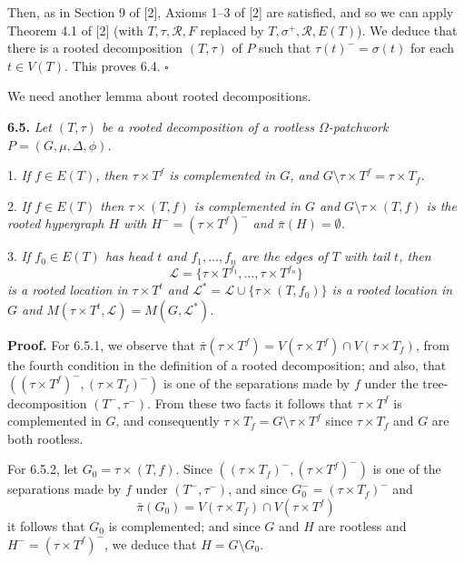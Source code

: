 Then, as in Section 9 of [2], Axioms 1--3 of [2] are satisfied, and so we can apply Theorem 4.1 of [2] (with $T, \tau, \mathscr{R}, F$ replaced by $T, \sigma^+, \mathscr{R}, E(T)$). We deduce that there is a rooted decomposition $(T, \tau)$ of $P$ such that $\tau(t)^- = \sigma(t)$ for each $t \in V(T)$. This proves 6.4. $\square$

We need another lemma about rooted decompositions.

\textbf{6.5.} \textit{Let $(T, \tau)$ be a rooted decomposition of a rootless $\Omega$-patchwork $P = (G, \mu, \Delta, \phi)$.}

\hspace*{12pt}1. \textit{If $f \in E(T)$, then $\tau \times T^f$ is complemented in $G$, and $G \setminus \tau \times T^f = \tau \times T_f$.}

\hspace*{12pt}2. \textit{If $f \in E(T)$ then $\tau \times (T, f)$ is complemented in $G$ and $G \setminus \tau \times (T, f)$ is the rooted hypergraph $H$ with $H^- = (\tau \times T^f)^-$ and $\bar{\pi}(H) = \emptyset$.}

\hspace*{12pt}3. \textit{If $f_0 \in E(T)$ has head $t$ and $f_1, \dots, f_n$ are the edges of $T$ with tail $t$, then}
\begin{equation*}
\mathscr{L} = \{\tau \times T^{f_1}, \dots, \tau \times T^{f_n}\}
\end{equation*}
\textit{is a rooted location in $\tau \times T^t$ and $\mathscr{L}^* = \mathscr{L} \cup \{\tau \times (T, f_0)\}$ is a rooted location in $G$ and $M(\tau \times T^t, \mathscr{L}) = M(G, \mathscr{L}^*)$.}

\textbf{Proof.} For 6.5.1, we observe that $\bar{\pi}(\tau \times T^f) = V(\tau \times T^f) \cap V(\tau \times T_f)$, from the fourth condition in the definition of a rooted decomposition; and also, that $((\tau \times T^f)^-, (\tau \times T_f)^-)$ is one of the separations made by $f$ under the tree-decomposition $(T^-, \tau^-)$. From these two facts it follows that $\tau \times T^f$ is complemented in $G$, and consequently $\tau \times T_f = G \setminus \tau \times T^f$ since $\tau \times T_f$ and $G$ are both rootless.

For 6.5.2, let $G_0 = \tau \times (T, f)$. Since $((\tau \times T_f)^-, (\tau \times T^f)^-)$ is one of the separations made by $f$ under $(T^-, \tau^-)$, and since $G_0^- = (\tau \times T_f)^-$ and
\begin{equation*}
\bar{\pi}(G_0) = V(\tau \times T_f) \cap V(\tau \times T^f)
\end{equation*}
it follows that $G_0$ is complemented; and since $G$ and $H$ are rootless and $H^- = (\tau \times T^f)^-$, we deduce that $H = G \setminus G_0$.

